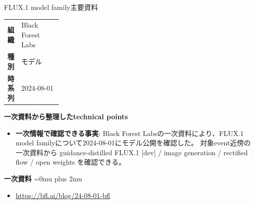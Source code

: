 \begin{technicalnote}{FLUX.1 model family}{主要資料}
\begingroup
\begin{tabularx}{\linewidth}{@{}>{\bfseries}p{0.22\linewidth}X@{}}
組織 & Black Forest Labs \\
種別 & モデル \\
時系列 & 2024-08-01 \\
\end{tabularx}
\smallskip
{\bfseries 一次資料から整理したtechnical points}
\begin{itemize}[leftmargin=1.5em,itemsep=0.35em]
\item \textbf{一次情報で確認できる事実}: Black Forest Labsの一次資料により、FLUX.1 model familyについて2024-08-01にモデル公開を確認した。 対象event近傍の一次資料から guidance-distilled FLUX.1 [dev] / image generation / rectified flow / open weights を確認できる。
\end{itemize}
\begin{minipage}{\linewidth}
\begin{samepage}
{\bfseries 一次資料}
\begingroup\sloppy
\Urlmuskip=0mu plus 2mu\relax
\begin{itemize}[leftmargin=1.5em,itemsep=0.25em]
\item {\scriptsize\url{https://bfl.ai/blog/24-08-01-bfl}}
\end{itemize}
\endgroup
\end{samepage}
\end{minipage}
\endgroup
\end{technicalnote}
\medskip

